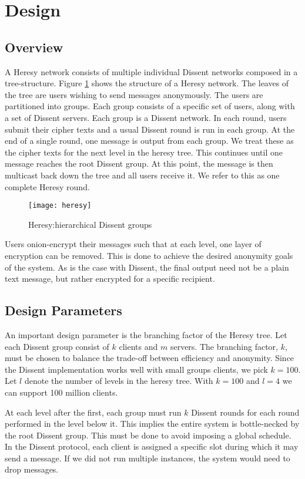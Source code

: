 \section{Design}
\subsection{Overview}
A Heresy network consists of multiple individual Dissent networks composed in a tree-structure. Figure \ref{fig:heresy} shows the structure of a Heresy network. The leaves of the tree are users wishing to send messages anonymously. The users are partitioned into groups. Each group consists of a specific set of users, along with a set of Dissent servers. Each group is a Dissent network. In each round, users submit their cipher texts and a usual Dissent round is run in each group. At the end of a single round, one message is output from each group. We treat these as the cipher texts for the next level in the heresy tree. This continues until one message reaches the root Dissent group. At this point, the message is then multicast back down the tree and all users receive it. We refer to this as one complete Heresy round.

\begin{figure}
\centering
\texttt{[image: heresy]}
\caption{Heresy:hierarchical Dissent groups}
\label{fig:heresy}
\end{figure}

Users onion-encrypt their messages such that at each level, one layer of encryption can be removed. This is done to achieve the desired anonymity goals of the system. As is the case with Dissent, the final output need not be a plain text message, but rather encrypted for a specific recipient.

\subsection{Design Parameters}

An important design parameter is the branching factor of the Heresy tree. Let each Dissent group consist of $k$ clients and $m$ servers. The branching factor, $k$, must be chosen to balance the trade-off between efficiency and anonymity. Since the Dissent implementation works well with small groups clients, we pick $k=100$. Let $l$ denote the number of levels in the heresy tree. With $k=100$ and $l=4$ we can support 100 million clients.

At each level after the first, each group must run $k$ Dissent rounds for each round performed in the level below it. This implies the entire system is bottle-necked by the root Dissent group. This must be done to avoid imposing a global schedule. In the Dissent protocol, each client is assigned a specific slot during which it may send a message. If we did not run multiple instances, the system would need to drop messages. 


